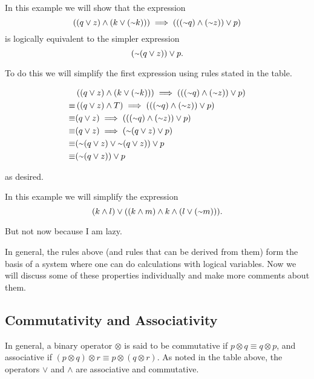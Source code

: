 \begin{example}
In this example we will show that the expression
\[\left((q \lor z) \land (k \lor (\shortsim k))\right) \implies \left(((\shortsim q) \land (\shortsim z)) \lor p\right)\]
is logically equivalent to the simpler expression 
\[(\shortsim(q \lor z)) \lor p.\]

To do this we will simplify the first expression using rules stated in the table.

\begin{align*}
& \left((q \lor z) \land (k \lor (\shortsim k))\right) \implies \left(((\shortsim q) \land (\shortsim z)) \lor p\right) \\
\equiv& \left((q \lor z) \land T\right) \implies \left(((\shortsim q) \land (\shortsim z)) \lor p\right) \\
\equiv& (q \lor z) \implies \left(((\shortsim q) \land (\shortsim z)) \lor p\right) \\
\equiv& (q \lor z) \implies \left(\shortsim(q \lor z) \lor p\right) \\
\equiv& (\shortsim(q \lor z) \lor \shortsim(q \lor z)) \lor p \\
\equiv& (\shortsim(q \lor z)) \lor p
\end{align*}

as desired.
\end{example}

\begin{example}
In this example we will simplify the expression 
\[(k \land l) \lor ((k \land m) \land k \land (l \lor (\shortsim m))).\]

But not now because I am lazy.
\end{example}

In general, the rules above (and rules that can be derived from them) form the basis of a system where one can do calculations with logical variables. Now we will discuss some of these properties individually and make more comments about them.

\subsection{Commutativity and Associativity}

In general, a binary operator $\otimes$ is said to be commutative if $p \otimes q \equiv q \otimes p$, and associative if $(p \otimes q) \otimes r \equiv p \otimes (q \otimes r)$. As noted in the table above, the operators $\lor$ and $\land$ are associative and commutative.

